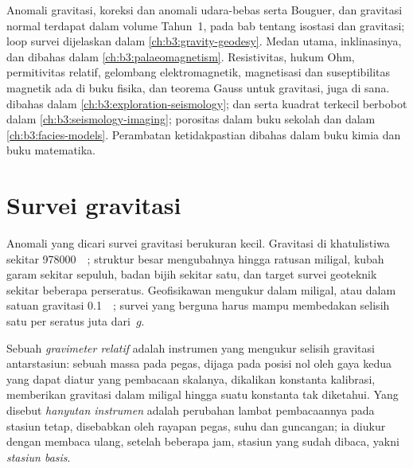 \begin{recall}
Anomali gravitasi, koreksi dan anomali udara-bebas serta Bouguer, dan
gravitasi normal terdapat dalam volume Tahun~1, pada bab tentang isostasi
dan gravitasi; loop survei  dijelaskan dalam
\cref{ch:b3:gravity-geodesy}. Medan utama, inklinasinya,  dan  dibahas dalam
\cref{ch:b3:palaeomagnetism}. Resistivitas, hukum Ohm, permitivitas
relatif, gelombang elektromagnetik, magnetisasi dan
suseptibilitas magnetik ada di buku fisika, dan teorema Gauss untuk
gravitasi, juga di sana.  dibahas dalam
\cref{ch:b3:exploration-seismology};  dan  serta
kuadrat terkecil berbobot dalam \cref{ch:b3:seismology-imaging}; porositas dalam
buku sekolah dan  dalam \cref{ch:b3:facies-models}. Perambatan
ketidakpastian dibahas dalam buku kimia dan buku matematika.
\end{recall}

\section{Survei gravitasi}\label{sec:b3:field-lab-methods-3:gravity}

Anomali yang dicari survei gravitasi berukuran kecil. Gravitasi di
khatulistiwa sekitar \qty{978000}{\milli\gal}; struktur besar mengubahnya
hingga ratusan miligal, kubah garam sekitar sepuluh, badan bijih sekitar
satu, dan target survei geoteknik sekitar beberapa
perseratus. Geofisikawan mengukur dalam
miligal, atau dalam satuan gravitasi \qty{0.1}{\milli\gal}; survei yang berguna
harus mampu membedakan selisih satu per seratus juta dari~$g$.

\begin{definition}\label{def:b3:field-lab-methods-3:gravimeter}
Sebuah \emph{gravimeter relatif} adalah
instrumen yang mengukur selisih gravitasi antarstasiun: sebuah
massa pada pegas, dijaga pada posisi nol oleh gaya kedua yang dapat diatur
yang pembacaan skalanya, dikalikan konstanta kalibrasi, memberikan gravitasi
dalam miligal hingga suatu konstanta tak diketahui. Yang disebut \emph{hanyutan
instrumen} adalah perubahan lambat pembacaannya pada
stasiun tetap, disebabkan oleh rayapan pegas, suhu dan
guncangan; ia diukur dengan membaca ulang, setelah beberapa jam, stasiun
yang sudah dibaca, yakni \emph{stasiun basis}.
\end{definition}


